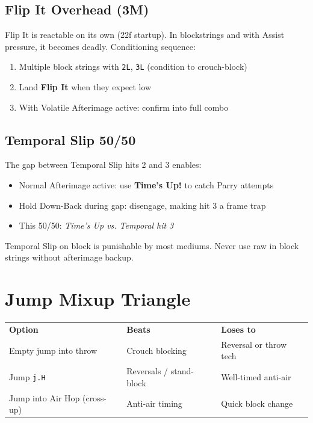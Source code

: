 \documentclass[12pt, a4paper]{report}
\newcommand{\notation}[1]{{\small\texttt{\textcolor{ekkoBlue}{#1}}}}
\newcommand{\movename}[1]{\textbf{\textcolor{ekkoGold}{#1}}}
\begin{document}
\subsection{Flip It Overhead (3M)}

Flip It is reactable on its own (22f startup). In blockstrings and with Assist pressure, it becomes deadly. Conditioning sequence:
\begin{enumerate}
  \item Multiple block strings with \notation{2L}, \notation{3L} (condition to crouch-block)
  \item Land \movename{Flip It} when they expect low
  \item With Volatile Afterimage active: confirm into full combo
\end{enumerate}

\subsection{Temporal Slip 50/50}

The gap between Temporal Slip hits 2 and 3 enables:
\begin{itemize}
  \item Normal Afterimage active: use \movename{Time's Up!} to catch Parry attempts
  \item Hold Down-Back during gap: disengage, making hit 3 a frame trap
  \item This 50/50: \textit{Time's Up vs. Temporal hit 3}
\end{itemize}

\begin{warnbox}
Temporal Slip on block is punishable by most mediums. Never use raw in block strings without afterimage backup.
\end{warnbox}

\section{Jump Mixup Triangle}

\begin{center}
\begin{tabular}{L{4.5cm} L{4.5cm} L{4.5cm}}
\textcolor{ekkoBlue}{\textbf{Option}} & \textcolor{ekkoBlue}{\textbf{Beats}} & \textcolor{ekkoBlue}{\textbf{Loses to}} \\
Empty jump into throw & Crouch blocking & Reversal or throw tech \\
Jump \notation{j.H} & Reversals / stand-block & Well-timed anti-air \\
Jump into Air Hop (cross-up) & Anti-air timing & Quick block change \\
\end{tabular}
\end{center}
\end{document}

